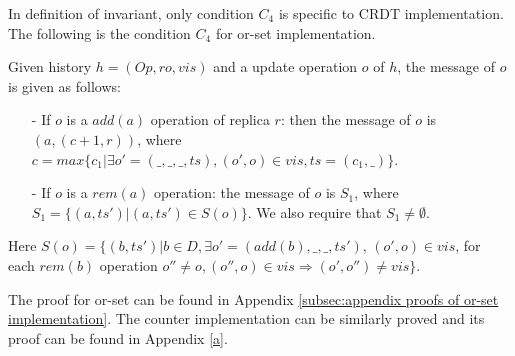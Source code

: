 

In definition of invariant, only condition $C_4$ is specific to CRDT implementation. The following is the condition $C_4$ for or-set implementation. 

\begin{example}
\label{example:c4 for or-set implementation}

Given history $h = (\mathit{Op},\mathit{ro},\mathit{vis})$ and a update operation $o$ of $h$, the message of $o$ is given as follows:

\begin{itemize}
\setlength{\itemsep}{0.5pt}
\item[-] If $o$ is a $\mathit{add}(a)$ operation of replica $r$:  then the message of $o$ is $(a,(c+1,r))$, where $c = \mathit{max}\{ c_1 \vert \exists o' = (\_,\_,\_,\mathit{ts}), (o',o) \in \mathit{vis}, \mathit{ts} = (c_1,\_) \}$.

\item[-] If $o$ is a $\mathit{rem}(a)$ operation: the message of $o$ is $S_1$, where $S_1 = \{ (a,\mathit{ts}') \vert (a,\mathit{ts}') \in S(o) \}$. We also require that $S_1 \neq \emptyset$.
\end{itemize}
Here $S(o) = \{ (b,\mathit{ts}') \vert b \in D, \exists o' = (\mathit{add}(b),\_,\_,\mathit{ts}')$, $(o',o) \in \mathit{vis}$, for each $\mathit{rem}(b)$ operation $o'' \neq o, (o'',o) \in \mathit{vis} \Rightarrow (o',o'') \neq \mathit{vis} \}$.
\end{example}

The proof for or-set can be found in Appendix \ref{subsec:appendix proofs of or-set implementation}. The counter implementation can be similarly proved and its proof can be found in Appendix \ref{a}. 




